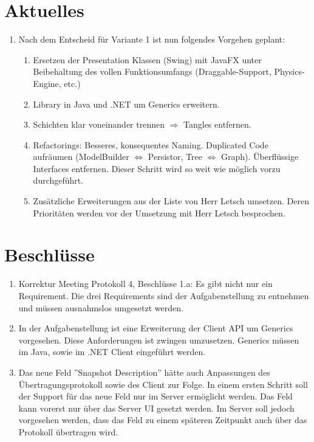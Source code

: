 \documentclass[11pt, a4paper,oneside]{scrartcl}
\begin{document}
\section{Aktuelles}
\begin{enumerate}
	\item Nach dem Entscheid für Variante 1 ist nun folgendes Vorgehen geplant:
	\begin{enumerate}
		\item Ersetzen der Presentation Klassen (Swing) mit JavaFX unter Beibehaltung des vollen Funktionsumfangs (Draggable-Support, Physics-Engine, etc.)
		\item Library in Java und .NET um Generics erweitern.
		\item Schichten klar voneinander trennen $\Rightarrow$ Tangles entfernen.
		\item Refactorings: Besseres, konsequentes Naming. Duplicated Code aufräumen (ModelBuilder $\Leftrightarrow$ Persistor, Tree $\Leftrightarrow$ Graph). Überflüssige Interfaces entfernen. Dieser Schritt wird so weit wie möglich vorzu durchgeführt.
		\item Zusätzliche Erweiterungen aus der Liste von Herr Letsch umsetzen. Deren Prioritäten werden vor der Umsetzung mit Herr Letsch besprochen.
	\end{enumerate}
\end{enumerate}

\section{Beschlüsse}
\begin{enumerate}
	\item Korrektur Meeting Protokoll 4, Beschlüsse 1.a: Es gibt nicht nur ein Requirement. Die drei Requirements sind der Aufgabenstellung zu entnehmen und müssen ausnahmslos umgesetzt werden.
	\item In der Aufgabenstellung ist eine Erweiterung der Client API um Generics vorgesehen. Diese Anforderungen ist zwingen umzusetzen. Generics müssen im Java, sowie im .NET Client eingeführt werden.
	\item Das neue Feld ''Snapshot Description'' hätte auch Anpassungen des Übertragungsprotokoll sowie des Client zur Folge. In einem ersten Schritt soll der Support für das neue Feld nur im Server ermöglicht werden. Das Feld kann vorerst nur über das Server UI gesetzt werden. Im Server soll jedoch vorgesehen werden, dass das Feld zu einem späteren Zeitpunkt auch über das Protokoll übertragen wird.
\end{enumerate}
\end{document}
